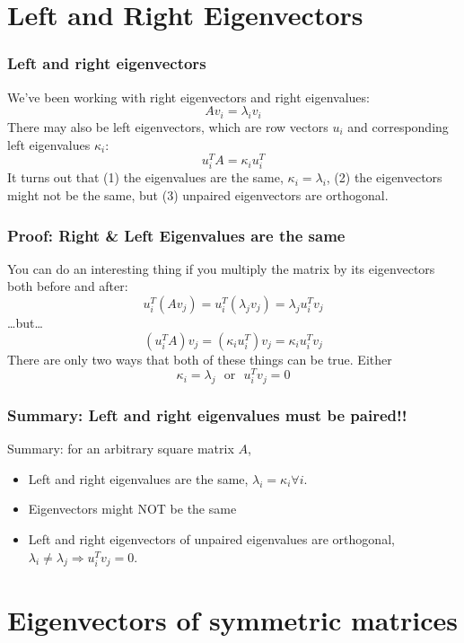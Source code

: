 \documentclass{beamer}
\begin{document}
\section[Eigenvectors]{Left and Right Eigenvectors}
\setcounter{subsection}{1}

\begin{frame}
  \frametitle{Left and right eigenvectors}
  We’ve been working with right eigenvectors and right eigenvalues: 
  \[
  A{v}_i =\lambda_i{v}_i
  \]
  There may also be left eigenvectors, which are row vectors ${u}_i$
  and corresponding left eigenvalues $\kappa_i$:
  \[
  {u}_i^T A = \kappa_i{u}_i^T
  \]
  It turns out that (1) the eigenvalues are the same,
  $\kappa_i=\lambda_i$, (2) the eigenvectors might not be the same, but
  (3) unpaired eigenvectors are orthogonal.
\end{frame}

\begin{frame}
  \frametitle{Proof: Right \& Left Eigenvalues are the same}
  You can do an interesting thing if you multiply the matrix by its eigenvectors both before and after:
  \[
  {u}_i^T(A{v}_j)={u}_i^T(\lambda_j{v}_j)=\lambda_j{u}_i^T{v}_j
  \]
  \ldots but\ldots
  \[
  ({u}_i^TA){v}_j=(\kappa_i{u}_i^T){v}_j=\kappa_i{u}_i^T{v}_j
  \]
  There are only two ways that both of these things can be true. Either
  \[
  \kappa_i=\lambda_j~~~\mbox{or}~~~{u}_i^T{v}_j=0
  \]
\end{frame}

\begin{frame}
  \frametitle{Summary: Left and right eigenvalues must be paired!!}

  Summary: for an arbitrary square matrix $A$,
  \begin{itemize}
  \item Left and right eigenvalues are the same,
    $\lambda_i=\kappa_i\forall i$.
  \item Eigenvectors might NOT be the same
  \item Left and right eigenvectors of unpaired eigenvalues are
    orthogonal, $\lambda_i\ne\lambda_j \Rightarrow u_i^Tv_j=0$.
  \end{itemize}
\end{frame}

\section[Symmetric]{Eigenvectors of symmetric matrices}
\setcounter{subsection}{1}
\end{document}
